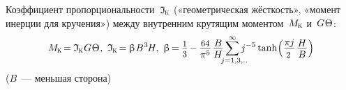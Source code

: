 \documentclass[14pt]{extarticle}
\newcommand{\lquote}[0]{«} %
\newcommand{\rquote}[0]{»} %
\newcommand{\inquotes}[1]{\lquote{#1}\rquote}
\begin{document}
\hspace*{-\parindent}%
\begin{minipage}{\linewidth}

\hspace{\savedparindent}
Коэффициент пропорциональности~${\mathfrak{I}_{\hspace{-0.1ex}\mathrm{\scalebox{.6}{K}}}}$ (\inquotes{геометрическая жёсткость}, \inquotes{момент инерции для кручения}) между внутренним крутящим моментом~${M_{\hspace{-0.1ex}\mathrm{\scalebox{.6}{K}}}}$ и~${G \hspace{.1ex} \Theta}$:
\[
M_{\hspace{-0.1ex}\mathrm{\scalebox{.6}{K}}} \hspace{-0.3ex}=\hspace{-0.1ex}
\mathfrak{I}_{\hspace{-0.1ex}\mathrm{\scalebox{.6}{K}}} \hspace{.1ex} G \hspace{.1ex} \Theta
\hspace{.1ex} , \hspace{.33em}
\mathfrak{I}_{\hspace{-0.1ex}\mathrm{\scalebox{.6}{K}}} \hspace{-0.3ex}=\hspace{-0.1ex}
\upbeta \hspace{.1ex} B^{\hspace{.1ex}3} \hspace{-0.2ex} H
, \hspace{.33em}
%
\upbeta \hspace{-0.2ex}=\hspace{-0.1ex}
\scalebox{.88}{$\displaystyle\frac{\raisebox{-0.18em}{$1$}}{3}$}
\hspace{-0.1ex}-\hspace{-0.1ex} \displaystyle\frac{\raisebox{-0.18em}{\scalebox{.88}{$64$}}}{\pi^5} \hspace{.2ex} \displaystyle\frac{\raisebox{-0.2em}{$B$}}{H} \displaystyle\sum_{\mathclap{\hspace{.4em}j=1,3,..}}^{\raisebox{-0.1em}{\scalebox{.75}{$\infty$}}} j^{-5} \operatorname{tanh} \hspace{-0.33ex} \left( \displaystyle\frac{\raisebox{-0.18em}{$\pi \hspace{-0.1ex} j$}}{\scalebox{.88}{$2$}} \hspace{.2ex} \displaystyle\frac{\raisebox{-0.2em}{$H$}}{B} \hspace{.1ex} \right)
\vspace{-.6em}\]
($B$~--- меньшая сторона)

\end{minipage}
\vspace{.5em}
\end{document}
